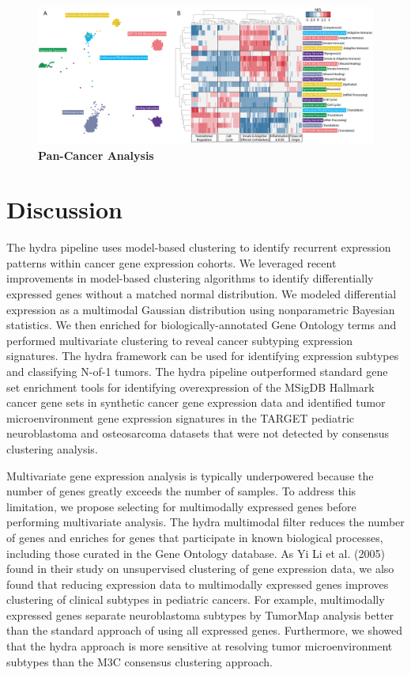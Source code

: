 \documentclass[10pt,letterpaper]{article}
\begin{document}
\begin{figure}[!h]
	\includegraphics[width=1.05\textwidth]{img/hydra-pan-small-round-blue-V1-2x}
	\caption{{\bf Pan-Cancer Analysis}}
	\label{hefig}
\end{figure}


\section*{Discussion}
The hydra pipeline uses model-based clustering to identify recurrent expression patterns within cancer gene expression cohorts. We leveraged recent improvements in model-based clustering algorithms to identify differentially expressed genes without a matched normal distribution. We modeled differential expression as a multimodal Gaussian distribution using nonparametric Bayesian statistics. We then enriched for biologically-annotated Gene Ontology terms and performed multivariate clustering to reveal cancer subtyping expression signatures. The hydra framework can be used for identifying expression subtypes and classifying N-of-1 tumors. The hydra pipeline outperformed standard gene set enrichment tools for identifying overexpression of the MSigDB Hallmark cancer gene sets in synthetic cancer gene expression data and identified tumor microenvironment gene expression signatures in the TARGET pediatric neuroblastoma and osteosarcoma datasets that were not detected by consensus clustering analysis. 

Multivariate gene expression analysis is typically underpowered because the number of genes greatly exceeds the number of samples. To address this limitation, we propose selecting for multimodally expressed genes before performing multivariate analysis. The hydra multimodal filter reduces the number of genes and enriches for genes that participate in known biological processes, including those curated in the Gene Ontology database. As Yi Li et al. (2005) found in their study on unsupervised clustering of gene expression data, we also found that reducing expression data to multimodally expressed genes improves clustering of clinical subtypes in pediatric cancers. For example, multimodally expressed genes separate neuroblastoma subtypes by TumorMap analysis better than the standard approach of using all expressed genes. Furthermore, we showed that the hydra approach is more sensitive at resolving tumor microenvironment subtypes than the M3C consensus clustering approach.
\end{document}
